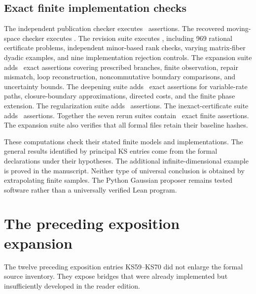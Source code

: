 \documentclass[11pt]{article}
\begin{document}
\subsection{Exact finite implementation checks}
The independent publication checker executes \EditionOriginalChecks\ assertions. The recovered moving-space checker executes \EditionRecoveredChecks. The revision suite executes \EditionRevisionChecks, including 969 rational certificate problems, independent minor-based rank checks, varying matrix-fiber dyadic examples, and nine implementation rejection controls. The expansion suite adds \EditionExpansionChecks\ exact assertions covering prescribed branches, finite observation, repair mismatch, loop reconstruction, noncommutative boundary comparisons, and uncertainty bounds. The deepening suite adds \EditionDeepeningChecks\ exact assertions for variable-rate paths, closure-boundary approximations, directed costs, and the finite phase extension. The regularization suite adds \EditionRegularizationChecks\ assertions. The inexact-certificate suite adds \EditionInexactChecks\ assertions. Together the seven rerun suites contain \EditionTotalChecks\ exact finite assertions. The expansion suite also verifies that all formal files retain their baseline hashes.

These computations check their stated finite models and implementations. The general results identified by principal KS entries come from the formal declarations under their hypotheses. The additional infinite-dimensional example is proved in the manuscript. Neither type of universal conclusion is obtained by extrapolating finite samples. The Python Gaussian proposer remains tested software rather than a universally verified Lean program.

\section{The preceding exposition expansion}
The twelve preceding exposition entries KS59--KS70 did not enlarge the formal source inventory. They expose bridges that were already implemented but insufficiently developed in the reader edition.
\end{document}
